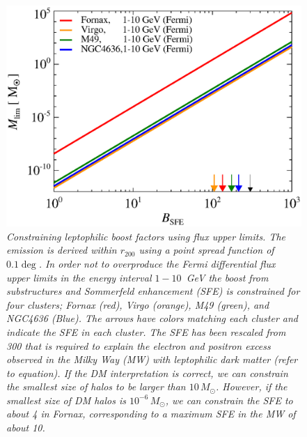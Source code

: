 \documentclass[10pt,aps,pra,reprint,amsmath,amsfonts,amssymb,showpacs]{revtex4-1}
\newcommand{\msun}{{M_\odot}}
\newcommand{\rvir}{r_{200}}
\begin{document}
\begin{figure}%
 \includegraphics[width=0.99\columnwidth]{figures/LP.const.diff.v8.0.1deg.1.6T.SubMass.SF300.IR2.noMW.woGal.eps}
\caption{\it Constraining leptophilic boost factors using flux upper
  limits. The emission is derived within $\rvir$ using a point spread
  function of $0.1\deg$. In order not to overproduce the Fermi
  differential flux upper limits in the energy interval $1-10$~GeV the
  boost from substructures and Sommerfeld enhancement (SFE) is
  constrained for four clusters; Fornax (red), Virgo (orange), M49
  (green), and NGC4636 (Blue). The arrows have colors matching each
  cluster and indicate the SFE in each cluster. The SFE has been
  rescaled from 300 that is required to explain the electron and
  positron excess observed in the Milky Way (MW) with leptophilic dark
  matter (refer to equation). If the DM interpretation is correct, we
  can constrain the smallest size of halos to be larger than
  $10\,\msun$. However, if the smallest size of DM halos is
  $10^{-6}\,\msun$, we can constrain the SFE to about 4 in Fornax,
  corresponding to a maximum SFE in the MW of about 10.}
 \label{fig10}
\end{figure}
\end{document}

